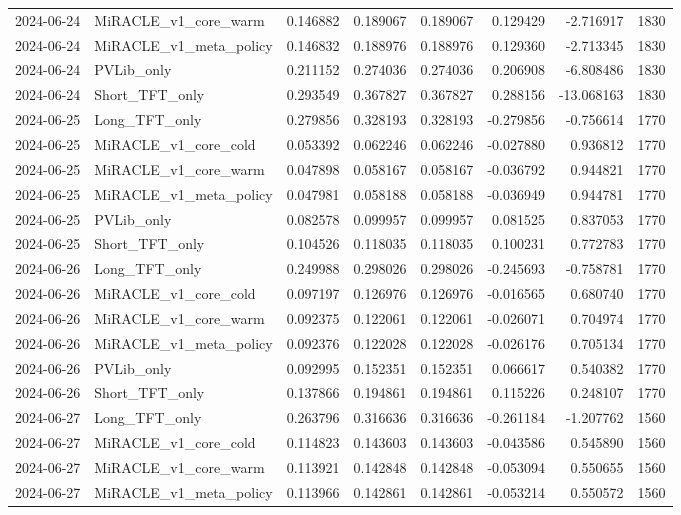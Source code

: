 \begin{tabular}{llrrrrrr}
2024-06-24 & MiRACLE_v1_core_warm & 0.146882 & 0.189067 & 0.189067 & 0.129429 & -2.716917 & 1830 \\
2024-06-24 & MiRACLE_v1_meta_policy & 0.146832 & 0.188976 & 0.188976 & 0.129360 & -2.713345 & 1830 \\
2024-06-24 & PVLib_only & 0.211152 & 0.274036 & 0.274036 & 0.206908 & -6.808486 & 1830 \\
2024-06-24 & Short_TFT_only & 0.293549 & 0.367827 & 0.367827 & 0.288156 & -13.068163 & 1830 \\
2024-06-25 & Long_TFT_only & 0.279856 & 0.328193 & 0.328193 & -0.279856 & -0.756614 & 1770 \\
2024-06-25 & MiRACLE_v1_core_cold & 0.053392 & 0.062246 & 0.062246 & -0.027880 & 0.936812 & 1770 \\
2024-06-25 & MiRACLE_v1_core_warm & 0.047898 & 0.058167 & 0.058167 & -0.036792 & 0.944821 & 1770 \\
2024-06-25 & MiRACLE_v1_meta_policy & 0.047981 & 0.058188 & 0.058188 & -0.036949 & 0.944781 & 1770 \\
2024-06-25 & PVLib_only & 0.082578 & 0.099957 & 0.099957 & 0.081525 & 0.837053 & 1770 \\
2024-06-25 & Short_TFT_only & 0.104526 & 0.118035 & 0.118035 & 0.100231 & 0.772783 & 1770 \\
2024-06-26 & Long_TFT_only & 0.249988 & 0.298026 & 0.298026 & -0.245693 & -0.758781 & 1770 \\
2024-06-26 & MiRACLE_v1_core_cold & 0.097197 & 0.126976 & 0.126976 & -0.016565 & 0.680740 & 1770 \\
2024-06-26 & MiRACLE_v1_core_warm & 0.092375 & 0.122061 & 0.122061 & -0.026071 & 0.704974 & 1770 \\
2024-06-26 & MiRACLE_v1_meta_policy & 0.092376 & 0.122028 & 0.122028 & -0.026176 & 0.705134 & 1770 \\
2024-06-26 & PVLib_only & 0.092995 & 0.152351 & 0.152351 & 0.066617 & 0.540382 & 1770 \\
2024-06-26 & Short_TFT_only & 0.137866 & 0.194861 & 0.194861 & 0.115226 & 0.248107 & 1770 \\
2024-06-27 & Long_TFT_only & 0.263796 & 0.316636 & 0.316636 & -0.261184 & -1.207762 & 1560 \\
2024-06-27 & MiRACLE_v1_core_cold & 0.114823 & 0.143603 & 0.143603 & -0.043586 & 0.545890 & 1560 \\
2024-06-27 & MiRACLE_v1_core_warm & 0.113921 & 0.142848 & 0.142848 & -0.053094 & 0.550655 & 1560 \\
2024-06-27 & MiRACLE_v1_meta_policy & 0.113966 & 0.142861 & 0.142861 & -0.053214 & 0.550572 & 1560 \\

\end{tabular}
